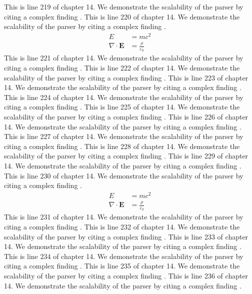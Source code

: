 This is line 219 of chapter 14. We demonstrate the scalability of the parser by citing a complex finding \cite{ref14_219}.
This is line 220 of chapter 14. We demonstrate the scalability of the parser by citing a complex finding \cite{ref14_220}.
\begin{align*}
  E &= mc^2 \\
  \nabla \cdot \mathbf{E} &= \frac{\rho}{\varepsilon_0}
\end{align*}
This is line 221 of chapter 14. We demonstrate the scalability of the parser by citing a complex finding \cite{ref14_221}.
This is line 222 of chapter 14. We demonstrate the scalability of the parser by citing a complex finding \cite{ref14_222}.
This is line 223 of chapter 14. We demonstrate the scalability of the parser by citing a complex finding \cite{ref14_223}.
This is line 224 of chapter 14. We demonstrate the scalability of the parser by citing a complex finding \cite{ref14_224}.
This is line 225 of chapter 14. We demonstrate the scalability of the parser by citing a complex finding \cite{ref14_225}.
This is line 226 of chapter 14. We demonstrate the scalability of the parser by citing a complex finding \cite{ref14_226}.
This is line 227 of chapter 14. We demonstrate the scalability of the parser by citing a complex finding \cite{ref14_227}.
This is line 228 of chapter 14. We demonstrate the scalability of the parser by citing a complex finding \cite{ref14_228}.
This is line 229 of chapter 14. We demonstrate the scalability of the parser by citing a complex finding \cite{ref14_229}.
This is line 230 of chapter 14. We demonstrate the scalability of the parser by citing a complex finding \cite{ref14_230}.
\begin{align*}
  E &= mc^2 \\
  \nabla \cdot \mathbf{E} &= \frac{\rho}{\varepsilon_0}
\end{align*}
This is line 231 of chapter 14. We demonstrate the scalability of the parser by citing a complex finding \cite{ref14_231}.
This is line 232 of chapter 14. We demonstrate the scalability of the parser by citing a complex finding \cite{ref14_232}.
This is line 233 of chapter 14. We demonstrate the scalability of the parser by citing a complex finding \cite{ref14_233}.
This is line 234 of chapter 14. We demonstrate the scalability of the parser by citing a complex finding \cite{ref14_234}.
This is line 235 of chapter 14. We demonstrate the scalability of the parser by citing a complex finding \cite{ref14_235}.
This is line 236 of chapter 14. We demonstrate the scalability of the parser by citing a complex finding \cite{ref14_236}.

